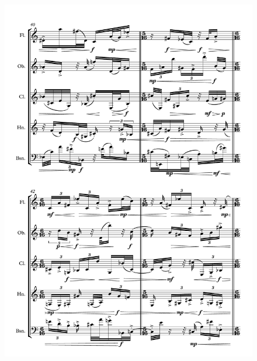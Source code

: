 \begin{figure}[H]
    \centering
	\includegraphics[width=6.5in]{figures/Out_of_Focus_8.pdf}
\end{figure}

